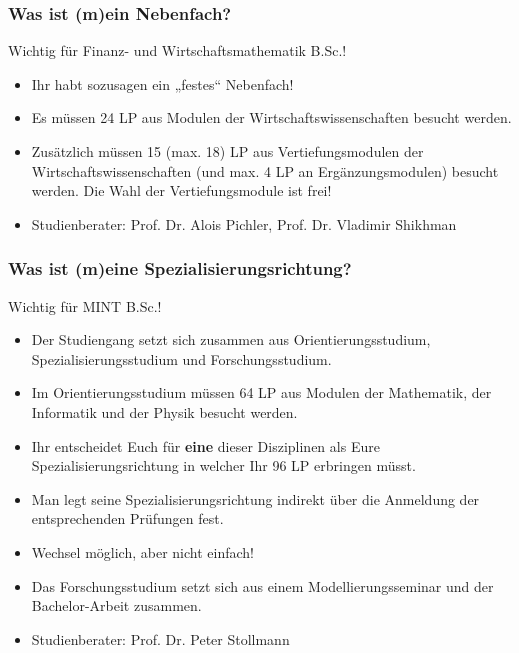 \documentclass[10pt]{beamer}
\makeatletter
\newcommand{\highl}[1]{\color{tuccolor@ma}#1\color{black}}
\makeatother
\begin{document}
\begin{frame}
	\frametitle{Was ist (m)ein Nebenfach?}

	\highl{Wichtig für Finanz- und Wirtschafts­mathematik B.Sc.!}

	\vspace*{1.0cm}

	\begin{itemize}
		\item Ihr habt sozusagen ein „festes“ Nebenfach!
		\item Es müssen 24 LP aus Modulen der Wirtschaftswissenschaften besucht werden.
		\item Zusätzlich müssen 15 (max. 18) LP aus Vertiefungsmodulen der Wirtschaftswissenschaften (und max. 4 LP an Ergänzungsmodulen) besucht werden. Die Wahl der Vertiefungsmodule ist frei!
		\item Studienberater: Prof. Dr. Alois Pichler, Prof. Dr. Vladimir Shikhman
	\end{itemize}
\end{frame}

\begin{frame}
	\frametitle{Was ist (m)eine Spezialisierungsrichtung?}

	\highl{Wichtig für MINT B.Sc.!}

	\begin{itemize}
		\item Der Studiengang setzt sich zusammen aus Orientierungsstudium, Spezialisierungsstudium und Forschungsstudium. 
		\item Im Orientierungsstudium müssen 64 LP aus Modulen der Mathematik, der Informatik und der Physik besucht werden.
		\item Ihr entscheidet Euch für \textbf{eine} dieser Disziplinen als Eure Spezialisierungsrichtung in welcher Ihr 96 LP erbringen müsst.
		\item Man legt seine Spezialisierungsrichtung indirekt über die Anmeldung der entsprechenden Prüfungen fest.
		\item Wechsel möglich, aber nicht einfach!
		\item Das Forschungsstudium setzt sich aus einem Modellierungsseminar und der Bachelor-Arbeit zusammen.
		\item Studienberater: Prof. Dr. Peter Stollmann
	\end{itemize}
\end{frame}
\end{document}
